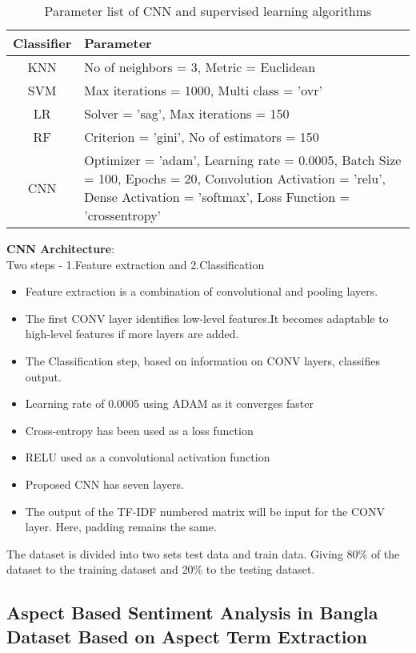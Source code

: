 \documentclass[a4paper,12pt]{article}
\begin{document}
\begin{table}[h!]
    \centering
    \caption{Parameter list of CNN and supervised learning algorithms}
    \begin{tabular}{|c|m{10cm}|}
    \hline
    \textbf{Classifier} & \textbf{Parameter} \\
    \hline
    KNN & No of neighbors = 3, Metric = Euclidean \\
    \hline
    SVM & Max iterations = 1000, Multi class = 'ovr' \\
    \hline
    LR & Solver = 'sag', Max iterations = 150 \\
    \hline
    RF & Criterion = 'gini', No of estimators = 150 \\
    \hline
    CNN & Optimizer = 'adam', Learning rate = 0.0005, Batch Size = 100, Epochs = 20, Convolution Activation = 'relu', Dense Activation = 'softmax', Loss Function = 'crossentropy' \\
    \hline
    \end{tabular}
\end{table}
\textbf{CNN Architecture}: \\\hspace*{1cm}Two steps - 1.Feature extraction and 2.Classification
    \begin{itemize}
        \item Feature extraction is a combination of convolutional and pooling layers.
        \item The first CONV layer identifies low-level features.It becomes adaptable to high-level features if more layers are added.
        \item The Classification step, based on information on CONV layers, classifies output.
        \item Learning rate of 0.0005 using ADAM as it converges faster\cite{ADAM}
        \item Cross-entropy has been used as a loss function
        \item RELU used as a convolutional activation function
        \item Proposed CNN has seven layers.
        \item The output of the TF-IDF numbered matrix will be input for the CONV layer. Here, padding remains the same. 
    \end{itemize}
The dataset is divided into two sets test data and train data. Giving 80\% of the dataset to the training dataset and 20\% to the testing dataset.
\subsection{Aspect Based Sentiment Analysis in Bangla Dataset Based on Aspect Term Extraction}
\end{document}
